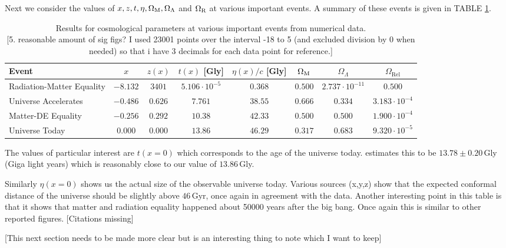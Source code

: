 \documentclass[%
reprint,
 amsmath,amssymb,
 aps,
]{revtex4-2}
\begin{document}
Next we consider the values of $x,z,t,\eta,\Omega_\text M, \Omega_\Lambda$ and $\Omega_\text R$ at various important events. A summary of these events is given in TABLE \ref{tab:cosmo_events}.
\renewcommand{\arraystretch}{1.25}
\begin{table} %
	\caption{Results for cosmological parameters at various important events from numerical data. \\\color{red}[5. reasonable amount of sig figs? I used 23001 points over the interval -18 to 5 (and excluded division by 0 when needed) so that i have 3 decimals for each data point for reference.]\color{black}}
	\begin{tabular}{|l|c|c|c|c|c|c|c|}
		\hline
		Event & $x$ & $z(x)$ & $t(x)$ [Gly] & $\eta(x)/c$ [Gly] & $\Omega_\text M$ & $\Omega_{\Lambda}$ & $\Omega_{\text{Rel}}$ \\
		\hline
		Radiation-Matter Equality  & $-8.132$ & $3401$ & $5.106 \cdot 10^{-5}$ & $0.368$ & $0.500$ & $2.737 \cdot 10^{-11}$ & $0.500$ \\
		\hline
		Universe Accelerates & $-0.486$ & $0.626$ & $7.761$ & $38.55$ & $0.666$ & $0.334$ & $3.183\cdot10^{-4}$ \\
		\hline
		Matter-DE Equality & $-0.256$ & $0.292$ & $10.38$ & $42.33$ & $0.500$ & $0.500$ & $1.900\cdot10^{-4}$ \\
		\hline
		Universe Today & $0.000 $ & $0.000 $ & $13.86$ & $46.29$ & $0.317$ & $0.683$ & $9.320 \cdot 10^{-5}$ \\
		\hline
	\end{tabular}
	\label{tab:cosmo_events}
\end{table}

The values of particular interest are $t(x=0)$ which corresponds to the age of the universe today. \cite{1} estimates this to be $13.78\pm0.20\,$Gly (Giga light years) which is reasonably close to our value of $13.86\,$Gly. 

Similarly $\eta(x=0)$ shows us the actual size of the observable universe today. Various sources (x,y,z) show that the expected conformal distance of the universe should be slightly above $46\,$Gyr, once again in agreement with the data. Another interesting point in this table is that it shows that matter and radiation equality happened about 50000 years after the big bang. Once again this is similar to other reported figures. \color{blue}[Citations missing]\color{black}

\color{blue}[This next section needs to be made more clear but is an interesting thing to note which I want to keep]\color{black}
\end{document}
